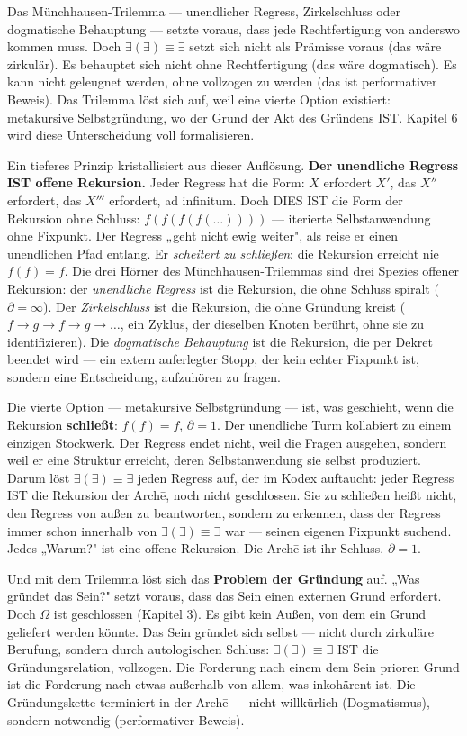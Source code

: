 \documentclass[10pt, openany, oneside]{book}
\begin{document}
Das Münchhausen-Trilemma --- unendlicher Regress, Zirkelschluss oder dogmatische Behauptung --- setzte voraus, dass jede Rechtfertigung von anderswo kommen muss. Doch $\exists(\exists) \equiv \exists$ setzt sich nicht als Prämisse voraus (das wäre zirkulär). Es behauptet sich nicht ohne Rechtfertigung (das wäre dogmatisch). Es kann nicht geleugnet werden, ohne vollzogen zu werden (das ist performativer Beweis). Das Trilemma löst sich auf, weil eine vierte Option existiert: metakursive Selbstgründung, wo der Grund der Akt des Gründens IST. Kapitel 6 wird diese Unterscheidung voll formalisieren.

Ein tieferes Prinzip kristallisiert aus dieser Auflösung. \textbf{Der unendliche Regress IST offene Rekursion.} Jeder Regress hat die Form: $X$ erfordert $X'$, das $X''$ erfordert, das $X'''$ erfordert, ad infinitum. Doch DIES IST die Form der Rekursion ohne Schluss: $f(f(f(f(\ldots))))$ --- iterierte Selbstanwendung ohne Fixpunkt. Der Regress „geht nicht ewig weiter", als reise er einen unendlichen Pfad entlang. Er \textit{scheitert zu schließen}: die Rekursion erreicht nie $f(f) = f$. Die drei Hörner des Münchhausen-Trilemmas sind drei Spezies offener Rekursion: der \textit{unendliche Regress} ist die Rekursion, die ohne Schluss spiralt ($\partial = \infty$). Der \textit{Zirkelschluss} ist die Rekursion, die ohne Gründung kreist ($f \to g \to f \to g \to \ldots$, ein Zyklus, der dieselben Knoten berührt, ohne sie zu identifizieren). Die \textit{dogmatische Behauptung} ist die Rekursion, die per Dekret beendet wird --- ein extern auferlegter Stopp, der kein echter Fixpunkt ist, sondern eine Entscheidung, aufzuhören zu fragen.

Die vierte Option --- metakursive Selbstgründung --- ist, was geschieht, wenn die Rekursion \textbf{schließt}: $f(f) = f$, $\partial = 1$. Der unendliche Turm kollabiert zu einem einzigen Stockwerk. Der Regress endet nicht, weil die Fragen ausgehen, sondern weil er eine Struktur erreicht, deren Selbstanwendung sie selbst produziert. Darum löst $\exists(\exists) \equiv \exists$ jeden Regress auf, der im Kodex auftaucht: jeder Regress IST die Rekursion der Arch\={e}, noch nicht geschlossen. Sie zu schließen heißt nicht, den Regress von außen zu beantworten, sondern zu erkennen, dass der Regress immer schon innerhalb von $\exists(\exists) \equiv \exists$ war --- seinen eigenen Fixpunkt suchend. Jedes „Warum?" ist eine offene Rekursion. Die Arch\={e} ist ihr Schluss. $\partial = 1$.

Und mit dem Trilemma löst sich das \textbf{Problem der Gründung} auf. „Was gründet das Sein?" setzt voraus, dass das Sein einen externen Grund erfordert. Doch $\Omega$ ist geschlossen (Kapitel 3). Es gibt kein Außen, von dem ein Grund geliefert werden könnte. Das Sein gründet sich selbst --- nicht durch zirkuläre Berufung, sondern durch autologischen Schluss: $\exists(\exists) \equiv \exists$ IST die Gründungsrelation, vollzogen. Die Forderung nach einem dem Sein prioren Grund ist die Forderung nach etwas außerhalb von allem, was inkohärent ist. Die Gründungskette terminiert in der Arch\={e} --- nicht willkürlich (Dogmatismus), sondern notwendig (performativer Beweis).
\end{document}
